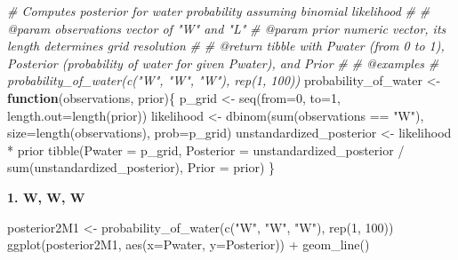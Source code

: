 \documentclass[
]{book}
\newenvironment{Shaded}{\begin{snugshade}}{\end{snugshade}}
\newcommand{\AttributeTok}[1]{\textcolor[rgb]{0.77,0.63,0.00}{#1}}
\newcommand{\CommentTok}[1]{\textcolor[rgb]{0.56,0.35,0.01}{\textit{#1}}}
\newcommand{\ControlFlowTok}[1]{\textcolor[rgb]{0.13,0.29,0.53}{\textbf{#1}}}
\newcommand{\DecValTok}[1]{\textcolor[rgb]{0.00,0.00,0.81}{#1}}
\newcommand{\FunctionTok}[1]{\textcolor[rgb]{0.00,0.00,0.00}{#1}}
\newcommand{\NormalTok}[1]{#1}
\newcommand{\OtherTok}[1]{\textcolor[rgb]{0.56,0.35,0.01}{#1}}
\newcommand{\SpecialCharTok}[1]{\textcolor[rgb]{0.00,0.00,0.00}{#1}}
\newcommand{\StringTok}[1]{\textcolor[rgb]{0.31,0.60,0.02}{#1}}
\begin{document}
\begin{Shaded}
\begin{Highlighting}[]
\CommentTok{\#\textquotesingle{} Computes posterior for water probability assuming binomial likelihood}
\CommentTok{\#\textquotesingle{}}
\CommentTok{\#\textquotesingle{} @param observations vector of "W" and "L"}
\CommentTok{\#\textquotesingle{} @param prior numeric vector, its length determines grid resolution}
\CommentTok{\#\textquotesingle{}}
\CommentTok{\#\textquotesingle{} @return tibble with Pwater (from 0 to 1), Posterior (probability of water for given Pwater), and Prior}
\CommentTok{\#\textquotesingle{}}
\CommentTok{\#\textquotesingle{} @examples}
\CommentTok{\#\textquotesingle{} probability\_of\_water(c("W", "W", "W"), rep(1, 100))}
\NormalTok{probability\_of\_water }\OtherTok{\textless{}{-}} \ControlFlowTok{function}\NormalTok{(observations, prior)\{}
\NormalTok{  p\_grid }\OtherTok{\textless{}{-}} \FunctionTok{seq}\NormalTok{(}\AttributeTok{from=}\DecValTok{0}\NormalTok{, }\AttributeTok{to=}\DecValTok{1}\NormalTok{, }\AttributeTok{length.out=}\FunctionTok{length}\NormalTok{(prior))}
\NormalTok{  likelihood }\OtherTok{\textless{}{-}} \FunctionTok{dbinom}\NormalTok{(}\FunctionTok{sum}\NormalTok{(observations }\SpecialCharTok{==} \StringTok{"W"}\NormalTok{), }\AttributeTok{size=}\FunctionTok{length}\NormalTok{(observations), }\AttributeTok{prob=}\NormalTok{p\_grid)}
\NormalTok{  unstandardized\_posterior }\OtherTok{\textless{}{-}}\NormalTok{ likelihood }\SpecialCharTok{*}\NormalTok{ prior}
  \FunctionTok{tibble}\NormalTok{(}\AttributeTok{Pwater =}\NormalTok{ p\_grid,}
         \AttributeTok{Posterior =}\NormalTok{ unstandardized\_posterior }\SpecialCharTok{/} \FunctionTok{sum}\NormalTok{(unstandardized\_posterior),}
         \AttributeTok{Prior =}\NormalTok{ prior)}
\NormalTok{\}}
\end{Highlighting}
\end{Shaded}

\textbf{1. W, W, W}

\begin{Shaded}
\begin{Highlighting}[]
\NormalTok{posterior2M1 }\OtherTok{\textless{}{-}} \FunctionTok{probability\_of\_water}\NormalTok{(}\FunctionTok{c}\NormalTok{(}\StringTok{"W"}\NormalTok{, }\StringTok{"W"}\NormalTok{, }\StringTok{"W"}\NormalTok{), }\FunctionTok{rep}\NormalTok{(}\DecValTok{1}\NormalTok{, }\DecValTok{100}\NormalTok{))}
\FunctionTok{ggplot}\NormalTok{(posterior2M1, }\FunctionTok{aes}\NormalTok{(}\AttributeTok{x=}\NormalTok{Pwater, }\AttributeTok{y=}\NormalTok{Posterior)) }\SpecialCharTok{+} 
  \FunctionTok{geom\_line}\NormalTok{()}
\end{Highlighting}
\end{Shaded}
\end{document}

